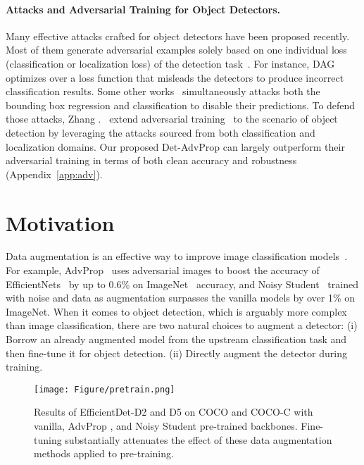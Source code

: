 \documentclass[final]{cvpr}
\begin{document}
\paragraph{Attacks and Adversarial Training for Object Detectors.}
Many effective attacks crafted for object detectors have been proposed recently. 
Most of them generate adversarial examples solely based on one individual loss (classification or localization loss) of the detection task~\cite{xie2017adversarial, chen2019shapeshifter, kevin2018phyattack, lu2017adversarial}. 
For instance, 
DAG~\cite{xie2017adversarial} optimizes over a loss function that misleads the detectors to produce incorrect classification results.
Some other works~\cite{li2019exploring, liu2019dpatch} simultaneously attacks both the bounding box regression and classification to disable their predictions.
To defend those attacks, Zhang \etal.~\cite{zhang2019towards} extend adversarial training~\cite{madry2018towards} to the scenario of object detection by leveraging the attacks sourced from both classification and localization domains. 
Our proposed Det-AdvProp can largely outperform their adversarial training in terms of both clean accuracy and robustness (Appendix~\ref{app:adv}).







\section{Motivation}
Data augmentation is an effective way to improve image classification models~\cite{cubuk2019autoaug, zhang2018mixup, cubuk2020randaug, xie2020self}.
For example, AdvProp~\cite{xie2020advprop} uses adversarial images to boost the accuracy of EfficientNets~\cite{tan2019enet} by up to 0.6\% on ImageNet~\cite{deng2009imagenet} accuracy, and Noisy Student~\cite{xie2020self} trained with noise and data as augmentation surpasses the vanilla models by over 1\% on ImageNet. When it comes to object detection, which is arguably more complex than image classification, there are two natural choices to augment a detector:
(i) Borrow an already augmented model from the upstream classification task and then fine-tune it for object detection. 
(ii) Directly augment the detector during training.

\begin{figure}[!htb]
\centering
\texttt{[image: Figure/pretrain.png]}
\caption{Results of EfficientDet-D2 and D5 on COCO and COCO-C with vanilla, AdvProp \cite{xie2020advprop}, and Noisy Student \cite{xie2020self} pre-trained backbones.
Fine-tuning substantially attenuates the effect of these data augmentation methods applied to pre-training.}
\label{fig:pretrain}
\vspace{-12pt}
\end{figure}
\end{document}
